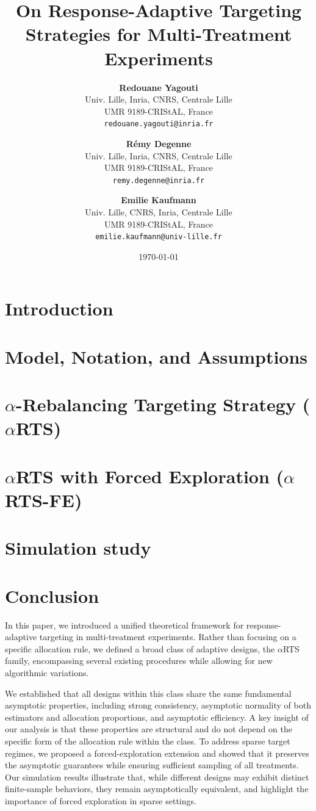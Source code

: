 \documentclass[11pt]{article}
\title{On Response-Adaptive Targeting Strategies for Multi-Treatment Experiments}
\author{
	\textbf{Redouane Yagouti}\\
	Univ. Lille, Inria,  CNRS, Centrale Lille\\
	UMR 9189-CRIStAL, France\\
	\texttt{redouane.yagouti@inria.fr}
	\and
	\textbf{Rémy Degenne}\\
	Univ. Lille, Inria,  CNRS, Centrale Lille\\
	UMR 9189-CRIStAL, France\\
	\texttt{remy.degenne@inria.fr}
	\and
	\textbf{Emilie Kaufmann}\\
	Univ. Lille, CNRS, Inria,  Centrale Lille\\
	UMR 9189-CRIStAL, France\\
	\texttt{emilie.kaufmann@univ-lille.fr}
}
\date{\today}
\theoremstyle{plain}
\theoremstyle{definition}
\begin{document}
	\maketitle

	\begin{abstract}
		
	\end{abstract}

	\section{Introduction}
	


	\section{Model, Notation, and Assumptions}\label{sec:notations}
	

	\section{$\alpha$-Rebalancing Targeting Strategy (\(\alpha\)RTS)}\label{sec:alpha-rts}
	
	

	\section{$\alpha$RTS with Forced Exploration ($\alpha$RTS-FE)}\label{sec:alpha-rts-fe}
	

	\section{Simulation study}\label{sec:simulation}
	

	\section{Conclusion}\label{sec:conclusion}
	In this paper, we introduced a unified theoretical framework for response-adaptive targeting in multi-treatment experiments. Rather than focusing on a specific allocation rule, we defined a broad class of adaptive designs, the $\alpha$RTS family, encompassing several existing procedures while allowing for new algorithmic variations.

	We established that all designs within this class share the same fundamental asymptotic properties, including strong consistency, asymptotic normality of both estimators and allocation proportions, and asymptotic efficiency. A key insight of our analysis is that these properties are structural and do not depend on the specific form of the allocation rule within the class. To address sparse target regimes, we proposed a forced-exploration extension and showed that it preserves the asymptotic guarantees while ensuring sufficient sampling of all treatments. Our simulation results illustrate that, while different designs may exhibit distinct finite-sample behaviors, they remain asymptotically equivalent, and highlight the importance of forced exploration in sparse settings.
\end{document}
